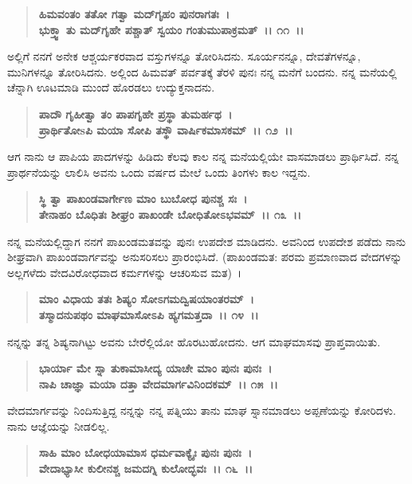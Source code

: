 \begin{verse}
\textbf{ಹಿಮವಂತಂ ತತೋ ಗತ್ವಾ ಮದ್‌ಗೃಹಂ ಪುನರಾಗತಃ~।}\\\textbf{ಭುಕ್ತ್ವಾ ತು ಮದ್‌ಗೃಹೇ ಪಶ್ಚಾತ್ ಸ್ವಯಂ ಗಂತುಮುಪಾಕ್ರಮತ್~।। ೧೧~।।}
\end{verse}

ಅಲ್ಲಿಗೆ ನನಗೆ ಅನೇಕ ಆಶ್ಚರ್ಯಕರವಾದ ವಸ್ತುಗಳನ್ನೂ ತೋರಿಸಿದನು. ಸೂರ್ಯನನ್ನೂ, ದೇವತೆಗಳನ್ನೂ, ಮುನಿಗಳನ್ನೂ ತೋರಿಸಿದನು. ಅಲ್ಲಿಂದ ಹಿಮವತ್ ಪರ್ವತಕ್ಕೆ ತೆರಳಿ ಪುನಃ ನನ್ನ ಮನೆಗೆ ಬಂದನು. ನನ್ನ ಮನೆಯಲ್ಲಿ ಚೆನ್ನಾಗಿ ಊಟಮಾಡಿ ಮುಂದೆ ಹೊರಡಲು ಉದ್ಯುಕ್ತನಾದನು.

\begin{verse}
\textbf{ಪಾದೌ ಗೃಹೀತ್ವಾ ತಂ ಪಾಪಗೃಹೇ ಪ್ರಸ್ಥಾ ತುಮರ್ಹಥ~।}\\\textbf{ಪ್ರಾರ್ಥಿತೋsಪಿ ಮಯಾ ಸೋಪಿ ತಸ್ಥೌ ವಾರ್ಷಿಕಮಾಸಕಮ್~।। ೧೨~।।}
\end{verse}

ಆಗ ನಾನು ಆ ಪಾಪಿಯ ಪಾದಗಳನ್ನು ಹಿಡಿದು ಕೆಲವು ಕಾಲ ನನ್ನ ಮನೆಯಲ್ಲಿಯೇ ವಾಸಮಾಡಲು ಪ್ರಾರ್ಥಿಸಿದೆ. ನನ್ನ ಪ್ರಾರ್ಥನೆಯನ್ನು ಲಾಲಿಸಿ ಅವನು ಒಂದು ವರ್ಷದ ಮೇಲೆ ಒಂದು ತಿಂಗಳು ಕಾಲ ಇದ್ದನು.

\begin{verse}
\textbf{ಸ್ಥಿ ತ್ವಾ ಪಾಖಂಡವಾರ್ಗೇಣ ಮಾಂ ಬುಬೋಧ ಪುನಶ್ಚ ಸಃ~।}\\\textbf{ತೇನಾಹಂ ಬೊಧಿತಃ ಶೀಘ್ರಂ ಪಾಖಂಡೇ ಬೋಧಿತೋಽಭವಮ್~।। ೧೩~।।}
\end{verse}

ನನ್ನ ಮನೆಯಲ್ಲಿದ್ದಾಗ ನನಗೆ ಪಾಖಂಡಮತವನ್ನು ಪುನಃ ಉಪದೇಶ ಮಾಡಿದನು. ಅವನಿಂದ ಉಪದೇಶ ಪಡೆದು ನಾನು ಶೀಘ್ರವಾಗಿ ಪಾಖಂಡವಾರ್ಗವನ್ನು ಅನುಸರಿಸಲು ಪ್ರಾರಂಭಿಸಿದೆ. (ಪಾಖಂಡಮತ: ಪರಮ ಪ್ರಮಾಣವಾದ ವೇದಗಳನ್ನು ಅಲ್ಲಗಳೆದು ವೇದವಿರೋಧವಾದ ಕರ್ಮಗಳನ್ನು ಆಚರಿಸುವ ಮತ)~।

\begin{verse}
\textbf{ಮಾಂ ವಿಧಾಯ ತತಃ ಶಿಷ್ಯಂ ಸೋಽಗಮದ್ವಿಷಯಾಂತರಮ್~।}\\\textbf{ತಸ್ಮಾದನುಪಥಂ ಮಾಘಮಾಸೋಽಪಿ ಹ್ಯಗಮತ್ತದಾ~।। ೧೪~।।}
\end{verse}

ನನ್ನನ್ನು ತನ್ನ ಶಿಷ್ಯನಾಗಿಟ್ಟು ಅವನು ಬೇರೆಲ್ಲಿಯೋ ಹೊರಟುಹೋದನು. ಆಗ ಮಾಘಮಾಸವು ಪ್ರಾಪ್ತವಾಯಿತು.

\begin{verse}
\textbf{ಭಾರ್ಯಾ ಮೇ ಸ್ನಾ ತುಕಾಮಾಸೀದ್ಯ ಯಾಚೇ ಮಾಂ ಪುನಃ ಪುನಃ~।}\\\textbf{ನಾಪಿ ಚಾಜ್ಞಾ ಮಯಾ ದತ್ತಾ ವೇದಮಾರ್ಗವಿನಿಂದಕಮ್~।। ೧೫~।।}
\end{verse}

ವೇದಮಾರ್ಗವನ್ನು ನಿಂದಿಸುತ್ತಿದ್ದ ನನ್ನನ್ನು ನನ್ನ ಪತ್ನಿಯು ತಾನು ಮಾಘ ಸ್ನಾನಮಾಡಲು ಅಪ್ಪಣೆಯನ್ನು ಕೋರಿದಳು. ನಾನು ಆಜ್ಞೆಯನ್ನು ನೀಡಲಿಲ್ಲ.

\begin{verse}
\textbf{ಸಾಹಿ ಮಾಂ ಬೋಧಯಾಮಾಸ ಧರ್ಮವಾಕ್ಯೈಃ ಪುನಃ ಪುನಃ~।}\\\textbf{ವೇದಾಭ್ಯಾಸೀ ಕುಲೀನಶ್ಚ ಜಮದಗ್ನಿ ಕುಲೋದ್ಭವಃ~।। ೧೬~।।} 
\end{verse}

